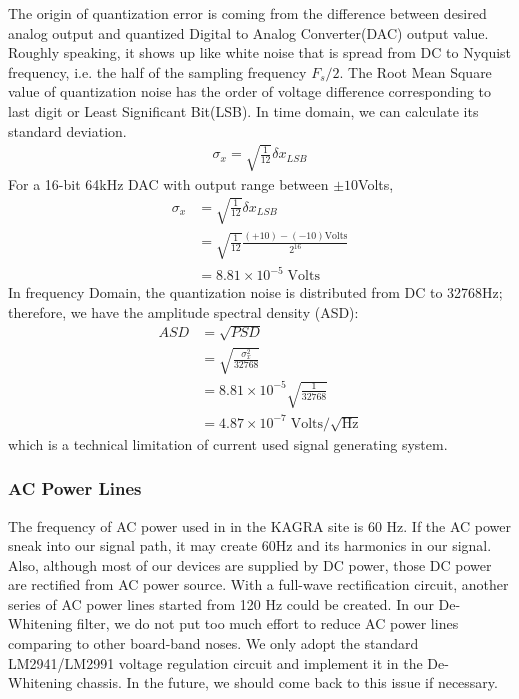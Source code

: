 The origin of quantization error is coming from the difference between desired analog output and quantized Digital to Analog Converter(DAC) output value. Roughly speaking, it shows up like white noise that is spread from DC to Nyquist frequency, i.e. the half of the sampling frequency $F_s/2$.
The Root Mean Square value of quantization noise has the order of voltage difference corresponding to last digit or Least Significant Bit(LSB). In time domain, we can calculate its standard deviation.
\begin{align}
   \sigma_x = \sqrt{\frac{1}{12}} \delta x_{LSB}
\end{align}
For a 16-bit 64kHz DAC with output range between $\pm 10$Volts, 
\begin{align}
    \sigma_x &= \sqrt{\frac{1}{12}} \delta x_{LSB} \\
             &= \sqrt{\frac{1}{12}} \frac{(+10)-(-10) \mathrm{Volts}}{2^{16}} \\
             &= 8.81 \times 10^{-5} \;\mathrm{Volts}
\end{align}
In frequency Domain, the quantization noise is distributed from DC to 32768Hz; therefore, we have the amplitude spectral density (ASD):
\begin{align}
    ASD &= \sqrt{PSD} \\
        &= \sqrt{ \frac{\sigma_x^2}{32768} } \\
        &= 8.81 \times 10^{-5} \sqrt{\frac{1}{32768}} \\
        &= 4.87 \times 10^{-7} \;\mathrm{Volts}/\sqrt{\mathrm{Hz}} 
\end{align}
which is a technical limitation of current used signal generating system.



\subsubsection{AC Power Lines}
The frequency of AC power used in in the KAGRA site is 60 Hz. If the AC power sneak into our signal path, it may create 60Hz and its harmonics in our signal. Also, although most of our devices are supplied by DC power, those DC power are rectified from AC power source. With a full-wave rectification circuit, another series of AC power lines started from 120 Hz could be created. In our De-Whitening filter, we do not put too much effort to reduce AC power lines comparing to other board-band noses. We only adopt the standard LM2941/LM2991 voltage regulation circuit and implement it in the De-Whitening chassis. In the future, we should come back to this issue if necessary.


